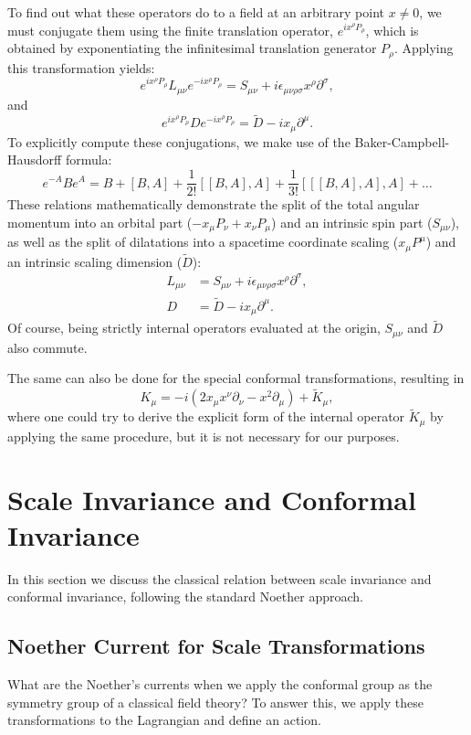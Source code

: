 To find out what these operators do to a field at an arbitrary point \(x \neq 0\), we must conjugate them using the finite translation operator, \(e^{ix^{\rho}P_{\rho}}\), which is obtained by exponentiating the infinitesimal translation generator \(P_{\rho}\). Applying this transformation yields:
\[
    e^{ix^{\rho}P_{\rho}}L_{\mu\nu}e^{-ix^{\rho}P_{\rho}}=S_{\mu\nu}+ i\epsilon_{\mu\nu\rho\sigma}x^{\rho}\partial^{\sigma},
\]
and
\[
    e^{ix^{\rho}P_{\rho}}De^{-ix^{\rho}P_{\rho}}=\tilde{D}-ix_{\mu}\partial^{\mu}.
\]
To explicitly compute these conjugations, we make use of the Baker-Campbell-Hausdorff formula:
\[
    e^{-A}Be^{A}=B+[B,A]+\frac{1}{2!}[[B,A],A]+\frac{1}{3!}[[[B,A],A],A]+\dots
\]
These relations mathematically demonstrate the split of the total angular momentum into an orbital part (\(-x_{\mu}P_{\nu}+x_{\nu}P_{\mu}\)) and an intrinsic spin part (\(S_{\mu\nu}\)), as well as the split of dilatations into a spacetime coordinate scaling (\(x_{\mu}P^{\mu}\)) and an intrinsic scaling dimension (\(\tilde{D}\)):
\[
    \begin{aligned}
        L_{\mu\nu} & = S_{\mu\nu} + i\epsilon_{\mu\nu\rho\sigma}x^{\rho}\partial^{\sigma}, \\
        D          & = \tilde{D} -ix_{\mu}\partial^{\mu}.
    \end{aligned}
\]
Of course, being strictly internal operators evaluated at the origin, \(S_{\mu\nu}\) and \(\tilde{D}\) also commute.

The same can also be done for the special conformal transformations, resulting in
\[
    K_{\mu}=-i(2x_{\mu}x^{\nu}\partial_{\nu}-x^{2}\partial_{\mu}) + \tilde{K}_\mu,
\]
where one could try to derive the explicit form of the internal operator \(\tilde{K}_\mu\) by applying the same procedure, but it is not necessary for our purposes.

\section{Scale Invariance and Conformal Invariance}

In this section we discuss the classical relation between scale invariance and conformal invariance, following the standard Noether approach.

\subsection{Noether Current for Scale Transformations}

What are the Noether's currents when we apply the conformal group as the symmetry group of a classical field theory? To answer this, we apply these transformations to the Lagrangian and define an action.

